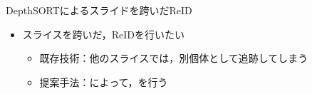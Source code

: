 \begin{frame}[noframenumbering]{DepthSORTによるスライドを跨いだReID}
    \begin{itemize}
        \item スライスを跨いだ，ReIDを行いたい
        \begin{itemize}
            \item 既存技術：他のスライスでは，別個体として追跡してしまう
            \item[\red{$\blacktriangleright$}] 提案手法：によって，を行う
        \end{itemize}
    \end{itemize}
\end{frame}
